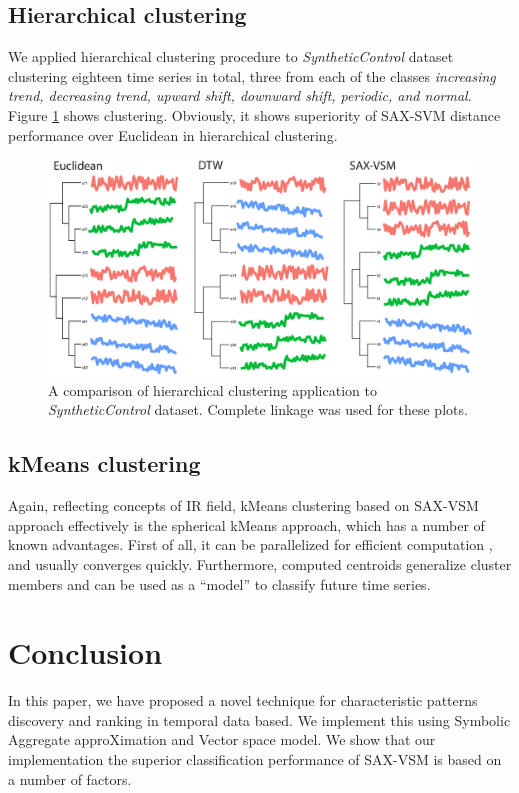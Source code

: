 \documentclass{llncs}
\begin{document}
\subsection{Hierarchical clustering}
We applied hierarchical clustering procedure to \textit{SyntheticControl} dataset clustering
eighteen time series in total, three from each of the classes \textit{increasing trend, decreasing
trend, upward shift, downward shift, periodic, and normal}. Figure \ref{fig:hc} shows
clustering. Obviously, it shows superiority of SAX-SVM distance performance over Euclidean in
hierarchical clustering.

\begin{figure}[t]
   \centering
   \includegraphics[width=115mm]{figures/clustering.eps}
   \caption{A comparison of hierarchical clustering application to \textit{SyntheticControl}
dataset. Complete linkage was used for these plots.
   }
   \label{fig:hc}
\end{figure}

\subsection{kMeans clustering}
Again, reflecting concepts of IR field, kMeans clustering based on SAX-VSM approach effectively
is the spherical kMeans approach, which has a number of known advantages. First of all, it can be
parallelized for efficient computation \cite{modha}, and usually converges quickly. Furthermore,
computed centroids generalize cluster members and can be used as a ``model'' to classify future 
time series.

\section{Conclusion}
In this paper, we have proposed a novel technique for characteristic patterns discovery 
and ranking in temporal data based. We implement this using Symbolic Aggregate approXimation 
and Vector space model. We show that our implementation the superior classification performance of SAX-VSM is based on 
a number of factors. 
\end{document}
